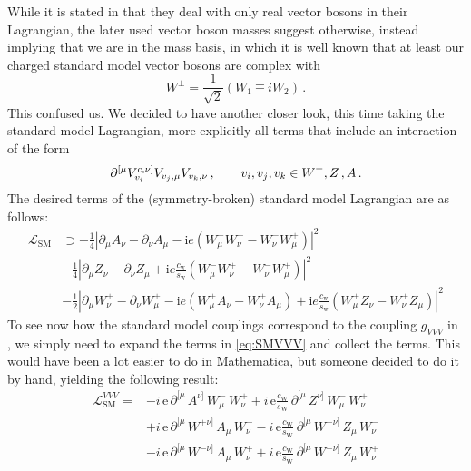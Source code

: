 While it is stated in \cite{penguin} that they deal with only real vector bosons in their Lagrangian, the later used vector boson masses suggest otherwise,
instead implying that we are in the mass basis, in which it is well known that at least our charged standard model vector bosons are complex with
\begin{equation}
    W^{\pm} = \frac{1}{\sqrt{2}}(W_1 \mp i W_2) \,.
\end{equation}
This confused us.
We decided to have another closer look, this time taking the standard model Lagrangian, more explicitly all terms that include an interaction of the form
\begin{equation}
    \partial_{\vphantom{v_i}}^{[\mu} V_{v_i}^{c,\nu]} V_{v_j, \mu} V_{v_k, \nu} \,, \qquad v_i, v_j, v_k \in {W^{\pm}, Z\,, A} \,.
\end{equation}
The desired terms of the (symmetry-broken) standard model Lagrangian are as follows:
\begin{equation}\begin{aligned}
    \mathcal{L}_\text{SM} &\supset -\frac14\left|\partial_\mu A_\nu-\partial_\nu A_\mu-\mathrm{i}e(W_\mu^-W_\nu^+-W_\nu^-W_\mu^+)\right|^2 \\
    &-\frac14\left|\partial_\mu Z_\nu-\partial_\nu Z_\mu+\mathrm{i}e\frac{c_\mathrm{w}}{s_\mathrm{w}}(W_\mu^-W_\nu^+-W_\nu^-W_\mu^+)\right|^2 \\
    &-\frac12\left|\partial_\mu W_\nu^+-\partial_\nu W_\mu^+-\mathrm{i}e(W_\mu^+A_\nu-W_\nu^+A_\mu) +\mathrm{i}e\frac{c_\mathrm{w}}{s_\mathrm{w}}(W_\mu^+Z_\nu-W_\nu^+Z_\mu)\right|^2
\end{aligned}
\label{eq:SMVVV}
\end{equation}
To see now how the standard model couplings correspond to the coupling $g_{VVV}$ in \cite{penguin}, we simply need to expand the terms in \eqref{eq:SMVVV}
and collect the terms.
This would have been a lot easier to do in Mathematica, but someone decided to do it by hand, yielding the following result:
\begin{align*}
    \mathcal{L}_\text{SM}^{VVV} = &- i \, \text{e} \, \partial^{[ \mu} \, A^{\nu ]} \, W_\mu^- \, W_\nu^+ + i \, \text{e} \frac{c_\text{W}}{s_\text{W}} \, \partial^{[ \mu} \, Z^{\nu ]} \, W_\mu^- \, W_\nu^+ \\
                                  &+ i \, \text{e} \, \partial^{[ \mu} \, W^{+ \nu]} \, A_\mu \, W_\nu^-  - i \, \text{e} \frac{c_\text{W}}{s_\text{W}} \, \partial^{[ \mu} \, W^{+ \nu]} \, Z_\mu \, W_\nu^-  \\
                                  &- i \, \text{e} \, \partial^{[ \mu} \, W^{- \nu]} \, A_\mu \, W_\nu^+  + i \, \text{e} \frac{c_\text{W}}{s_\text{W}} \, \partial^{[ \mu} \, W^{- \nu]} \, Z_\mu \, W_\nu^+  \\
\end{align*}
